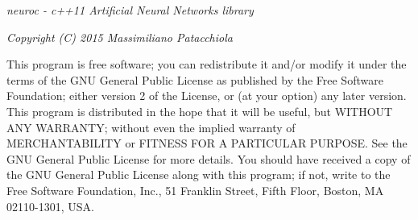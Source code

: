 {\itshape neuroc -\/ c++11 Artificial Neural Networks library}

{\itshape Copyright (C) 2015 Massimiliano Patacchiola}

This program is free software; you can redistribute it and/or modify it under the terms of the G\-N\-U General Public License as published by the Free Software Foundation; either version 2 of the License, or (at your option) any later version. This program is distributed in the hope that it will be useful, but W\-I\-T\-H\-O\-U\-T A\-N\-Y W\-A\-R\-R\-A\-N\-T\-Y; without even the implied warranty of M\-E\-R\-C\-H\-A\-N\-T\-A\-B\-I\-L\-I\-T\-Y or F\-I\-T\-N\-E\-S\-S F\-O\-R A P\-A\-R\-T\-I\-C\-U\-L\-A\-R P\-U\-R\-P\-O\-S\-E. See the G\-N\-U General Public License for more details. You should have received a copy of the G\-N\-U General Public License along with this program; if not, write to the Free Software Foundation, Inc., 51 Franklin Street, Fifth Floor, Boston, M\-A 02110-\/1301, U\-S\-A. 